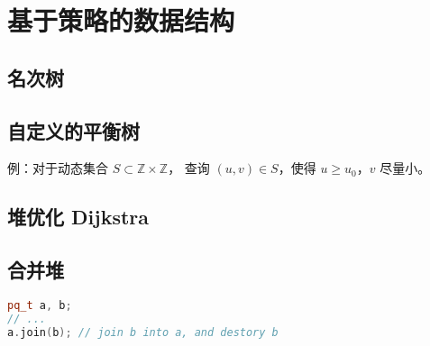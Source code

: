 \section{基于策略的数据结构}

\subsection{名次树}



\subsection{自定义的平衡树}

例：对于动态集合 $S \subset \mathbb{Z} \times \mathbb{Z}$，
查询 $(u, v) \in S$，使得 $u \geq u_0$，$v$ 尽量小。



\subsection{堆优化 Dijkstra}



\subsection{合并堆}

\begin{lstlisting}[language=c++]
pq_t a, b;
// ...
a.join(b); // join b into a, and destory b
\end{lstlisting}
